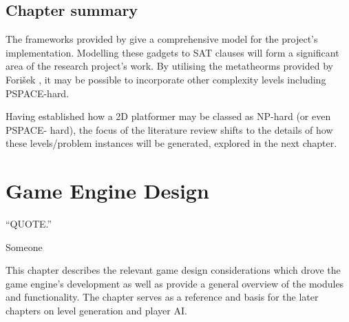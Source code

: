 \documentclass[11pt, a4paper, oneside]{report} %
\begin{document}




\section{Chapter summary}

The frameworks provided by \cite{Aloupis2012} give a comprehensive model for the
project's implementation. Modelling these gadgets to SAT clauses will form a
significant area of the research project's work. By utilising the metatheorms
provided by Fori\v{s}ek \cite{DBLP:conf/fun/Forisek10}, it may be possible to
incorporate other complexity levels including PSPACE-hard.

Having established how a 2D platformer may be classed as NP-hard (or even
PSPACE- hard), the focus of the literature review shifts to the details of how
these levels/problem instances will be generated, explored in the next chapter.



\chapter{Game Engine Design}

\epigraph{``QUOTE.''}{Someone}

This chapter describes the relevant game design considerations which drove the
game engine's development as well as provide a general overview of the modules
and functionality. The chapter serves as a reference and basis for the later
chapters on level generation and player AI.
\end{document}
